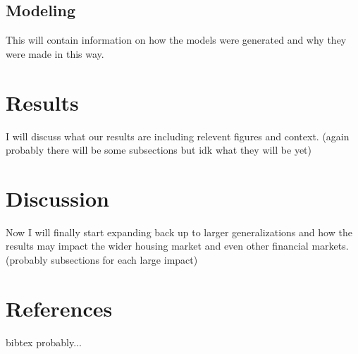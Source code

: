 \documentclass{article}
\begin{document}
\subsection{Modeling}
This will contain information on how the models were generated and why they were made in this way.

\section{Results}
I will discuss what our results are including relevent figures and context. (again probably there will be 
some subsections but idk what they will be yet)

\section{Discussion}
Now I will finally start expanding back up to larger generalizations and how the results may impact the 
wider housing market and even other financial markets. (probably subsections for each large impact)

\section{References}
bibtex probably...
\end{document}
